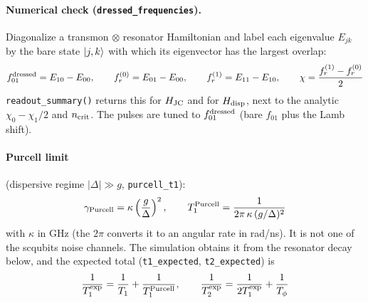 \documentclass[11pt]{article}
\begin{document}
\paragraph{Numerical check (\texttt{dressed\_frequencies}).}
Diagonalize a transmon $\otimes$ resonator Hamiltonian and label each eigenvalue $E_{jk}$ by the
bare state $\ket{j,k}$ with which its eigenvector has the largest overlap:
\begin{equation}
  f_{01}^{\rm dressed} = E_{10} - E_{00}, \qquad
  f_{r}^{(0)} = E_{01} - E_{00}, \qquad
  f_{r}^{(1)} = E_{11} - E_{10}, \qquad
  \chi = \frac{f_r^{(1)} - f_r^{(0)}}{2}
\end{equation}
\texttt{readout\_summary()} returns this for $H_{\rm JC}$ and for $H_{\rm disp}$, next to the
analytic $\chi_0 - \chi_1/2$ and $n_{\rm crit}$. The pulses are tuned to $f_{01}^{\rm dressed}$
(bare $f_{01}$ plus the Lamb shift).
\paragraph{Purcell limit} (dispersive regime $|\Delta| \gg g$, \texttt{purcell\_t1}):
\begin{equation}
  \gamma_{\rm Purcell} = \kappa\left(\frac{g}{\Delta}\right)^{2}, \qquad
  T_1^{\rm Purcell} = \frac{1}{2\pi\,\kappa\,(g/\Delta)^2}
\end{equation}
with $\kappa$ in GHz (the $2\pi$ converts it to an angular rate in rad/ns). It is not one of the
scqubits noise channels. The simulation obtains it from the resonator decay below, and the
expected total (\texttt{t1\_expected}, \texttt{t2\_expected}) is
\begin{equation}
  \frac{1}{T_1^{\rm exp}} = \frac{1}{T_1} + \frac{1}{T_1^{\rm Purcell}}, \qquad
  \frac{1}{T_2^{\rm exp}} = \frac{1}{2T_1^{\rm exp}} + \frac{1}{T_\phi}
\end{equation}

\end{document}
